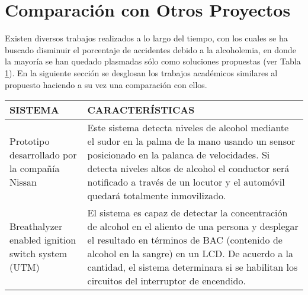 \section{Comparación con Otros Proyectos}
Existen diversos trabajos realizados a lo largo del tiempo, con los cuales se ha buscado disminuir el porcentaje de accidentes debido a la alcoholemia, en donde la mayoría se han quedado plasmadas sólo como soluciones propuestas (ver Tabla \ref{tab:comparacion}). En la siguiente sección se desglosan los trabajos académicos similares al propuesto haciendo a su vez una comparación con ellos.
\begin{table}[ht]
    \noindent \centering \resizebox{\textwidth}{!}
    {        
        \begin{tabular}{|p{3cm}|p{7cm}|}
            \hline
                SISTEMA & CARACTERÍSTICAS \\
            \hline
                Prototipo desarrollado por la compañía Nissan & Este sistema detecta niveles de alcohol mediante el sudor en la palma de la mano usando un sensor posicionado en la palanca de velocidades. Si detecta niveles altos de alcohol el conductor será notificado a través de un locutor y el automóvil quedará totalmente inmovilizado. \\
            \hline
                Breathalyzer enabled ignition switch system (UTM)& El sistema es capaz de detectar la concentración de alcohol en el aliento de una persona y desplegar el resultado en términos de BAC (contenido de alcohol en la sangre) en un LCD. De acuerdo a la cantidad, el sistema determinara si se habilitan los circuitos del interruptor de encendido.  \\
            \hline
        \end{tabular}
    }
     \label{tab:comparacion}
\end{table}